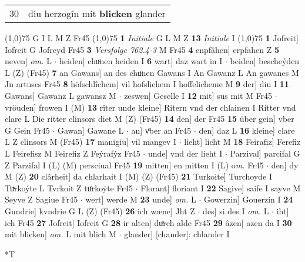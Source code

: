 \documentclass[8pt,a4paper,notitlepage]{article}
\begin{document}
\begin{table}[ht]
\begin{minipage}[t]{0.5\linewidth}
\begin{tabular}{rl}
30 & diu herzogîn mit \textbf{blicken} glander\\ 
\end{tabular}
\scriptsize
\line(1,0){75} \newline
G I L M Z Fr45 \newline
\line(1,0){75} \newline
\textbf{1} \textit{Initiale} G L M Z  \textbf{13} \textit{Initiale} I  \newline
\line(1,0){75} \newline
\textbf{1} Jofreit] Iofreit G Jofreyd Fr45 \textbf{3} \textit{Versfolge 762.4-3} M Fr45  \textbf{4} enpfâhen] erpfahen Z \textbf{5} neven] \textit{om.} L  $\cdot$ heiden] chuͦnen heiden I \textbf{6} wart] daz wart in I  $\cdot$ beiden] bescheýden L (Z) (Fr45) \textbf{7} an Gawans] an des chuͦnen Gawans I An Gawanz L An gawanes M Jn artuses Fr45 \textbf{8} höfschlîchem] vil hofslichem I hoffelicheme M \textbf{9} der] diu I \textbf{11} Gawans] Gawanz L gawansz M  $\cdot$ zeswen] Geselle I \textbf{12} mit] sus mit M Fr45  $\cdot$ vröuden] frowen I (M) \textbf{13} rîter unde kleine] Ritern vnd der chlainen I Ritter vnd clare L Die ritter clinsors diet M (Z) (Fr45) \textbf{14} den] der Fr45 \textbf{15} über gein] vber G Gein Fr45  $\cdot$ Gawan] Gawane L  $\cdot$ an] vͦber an Fr45  $\cdot$ den] daz L \textbf{16} kleine] clare L Z clinsors M (Fr45) \textbf{17} manigiu] vil mangev I  $\cdot$ lieht] licht M \textbf{18} Feirafiz] Ferefiz L Feirefisz M Feirefiz Z Feẏrafẏz Fr45  $\cdot$ unde] vnd der lieht I  $\cdot$ Parzival] parcifal G Z Parzifal I (L) (M) persciual Fr45 \textbf{19} mitten] en mitten I (L) o\textit{m. } Fr45  $\cdot$ den] dy M (Z) \textbf{20} clârheit] da chlarhait I (M) (Z) (Fr45) \textbf{21} Turkoite] Turchoyde I Tuͯrkoýte L Tvrkoit Z tuͦrkoẏte Fr45  $\cdot$ Florant] floriant I \textbf{22} Sagive] saife I sayve M Seyve Z Sagiue Fr45  $\cdot$ wert] werde M \textbf{23} unde] \textit{om.} L  $\cdot$ Gowerzin] Gouerzin I \textbf{24} Gundrie] kvndrie G L (Z) (Fr45) \textbf{26} ich wæne] Jht Z  $\cdot$ des] si des I \textit{om.} L  $\cdot$ iht] ich Fr45 \textbf{27} Jofreit] Iofreit G \textbf{28} ir alten] duͦrch alde Fr45 \textbf{29} âzen] azen da I \textbf{30} mit blicken] \textit{om.} L mit blich M  $\cdot$ glander] [chander]: chlander I \newline
\end{minipage}
\hspace{0.5cm}
\begin{minipage}[t]{0.5\linewidth}
\small
\begin{center}*T

\end{center}
\end{minipage}
\end{table}
\end{document}
